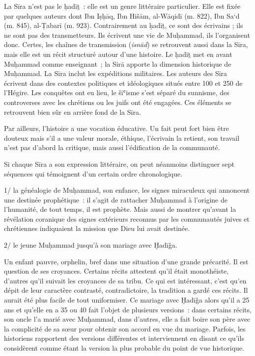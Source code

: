 La Sīra n'est pas le ḥadīṯ~: elle est un genre littéraire particulier.
Elle est fixée par quelques auteurs dont Ibn Iṣḥāq, Ibn Hišām, al-Wāqidī
(m. 822), Ibn Sa`d (m. 845), al-Ṭabarī (m. 923). Contrairement au ḥadīṯ,
ce sont des écrivains ; ils ne sont pas des transmetteurs. Ils écrivent
une vie de Muḥammad, ils l'organisent donc. Certes, les chaînes de
transmission (\emph{isnād}) se retrouvent aussi dans la Sīra, mais elle
est un récit structuré autour d'une histoire. Le ḥadīṯ met en avant
Muḥammad comme enseignant~; la Sirā apporte la dimension historique de
Muḥammad. La Sīra inclut les expéditions militaires. Les auteurs des
Sīra écrivent dans des contextes politiques et idéologiques situés entre
100 et 250 de l'Hégire. Les conquêtes ont eu lieu, le šīʿisme s'est
séparé du sunnisme, des controverses avec les chrétiens ou les juifs ont
été engagées. Ces éléments se retrouvent bien sûr en arrière fond de la
Sīra.

Par ailleurs, l'histoire a une vocation éducative. Un fait peut fort
bien être douteux mais s'il a une valeur morale, éthique, l'écrivain la
retient, son travail n'est pas d'abord la critique, mais aussi
l'édification de la communauté.

Si chaque Sīra a son expression littéraire, on peut néanmoins distinguer
sept séquences qui témoignent d'un certain ordre chronologique.


1/ la généalogie de Muḥammad, son enfance, les signes miraculeux qui
annoncent une destinée prophétique~: il s'agit de rattacher Muḥammad à
l'origine de l'humanité, de tout temps, il est prophète. Mais aussi de
montrer qu'avant la révélation coranique des signes extérieurs reconnus
par les communautés juives et chrétiennes indiquaient la mission que
Dieu lui avait destinée.

2/ le jeune Muḥammad jusqu'à son mariage avec Ḫadīǧa.

Un enfant pauvre, orphelin, bref dans une situation d'une grande
précarité. Il est question de ses croyances. Certains récits attestent
qu'il était monothéiste, d'autres qu'il suivait les croyances de sa
tribu. Ce qui est intéressant, c'est qu'en dépit de leur caractère
contrasté, contradictoire, la tradition a gardé ces récits. Il aurait
été plus facile de tout uniformiser. Ce mariage avec Ḫadīǧa alors qu'il
a 25 ans et qu'elle en a 35 ou 40 fait l'objet de plusieurs versions~:
dans certains récits, son oncle l'a marié avec Muḥammad, dans d'autres,
elle a fait boire son père avec la complicité de sa sœur pour obtenir
son accord en vue du mariage. Parfois, les historiens rapportent des
versions différentes et interviennent en disant ce qu'ils considèrent
comme étant la version la plus probable du point de vue historique.

